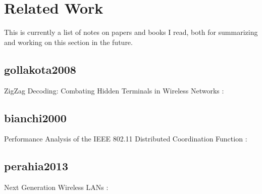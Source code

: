 
\chapter{Related Work}\label{ch:relatedwork}

\glsresetall %


This is currently a list of notes on papers and books I read, both for summarizing and working on this section in the future.


\section{gollakota2008}

ZigZag Decoding: Combating Hidden Terminals in Wireless Networks \cite{gollakota2008}:


\section{bianchi2000}

Performance Analysis of the IEEE 802.11 Distributed Coordination Function \cite{bianchi2000}:


\section{perahia2013}

Next Generation Wireless LANs \cite{perahia2013}:
